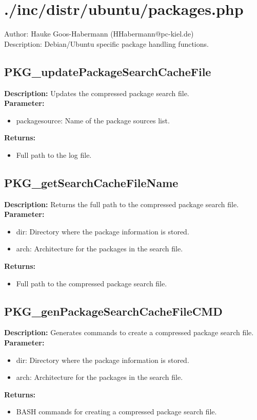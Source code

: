 \newpage\section{./inc/distr/ubuntu/packages.php}
 Author: Hauke Goos-Habermann (HHabermann@pc-kiel.de)\\
 Description: Debian/Ubuntu specific package handling functions.\\

\subsection{PKG\_updatePackageSearchCacheFile}
\textbf{Description:} Updates the compressed package search file.\\
\textbf{Parameter:}
\begin{itemize}
\item packagesource: Name of the package sources list.
\end{itemize}
\textbf{Returns:}
\begin{itemize}
\item Full path to the log file.
\end{itemize}

\subsection{PKG\_getSearchCacheFileName}
\textbf{Description:} Returns the full path to the compressed package search file.\\
\textbf{Parameter:}
\begin{itemize}
\item dir: Directory where the package information is stored.
\item arch: Architecture for the packages in the search file.
\end{itemize}
\textbf{Returns:}
\begin{itemize}
\item Full path to the compressed package search file.
\end{itemize}

\subsection{PKG\_genPackageSearchCacheFileCMD}
\textbf{Description:} Generates commands to create a compressed package search file.\\
\textbf{Parameter:}
\begin{itemize}
\item dir: Directory where the package information is stored.
\item arch: Architecture for the packages in the search file.
\end{itemize}
\textbf{Returns:}
\begin{itemize}
\item BASH commands for creating a compressed package search file.
\end{itemize}

